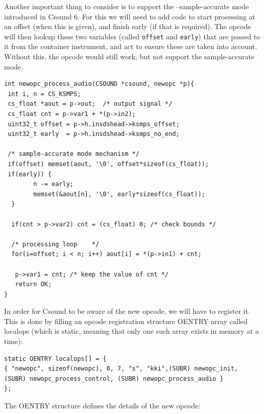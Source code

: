 \documentclass[11pt]{article}
\begin{document}
Another important thing to consider is to support the --sample-accurate mode introduced in Csound 6. For this we will need to add code to start processing at an offset (when this is given), and finish early (if that is required). The opcode will then lookup these two variables (called {\tt offset} and {\tt early}) that are passed to it from the container instrument, and act to ensure these are taken into account. Without this, the opcode would still work, but not support the sample-accurate mode.

\begin{lstlisting}
int newopc_process_audio(CSOUND *csound, newopc *p){
 int i, n = CS_KSMPS;
 cs_float *aout = p->out;  /* output signal */
 cs_float cnt = p->var1 + *(p->in2);
 uint32_t offset = p->h.insdshead->ksmps_offset;
 uint32_t early  = p->h.insdshead->ksmps_no_end;

 /* sample-accurate mode mechanism */
 if(offset) memset(aout, '\0', offset*sizeof(cs_float));
 if(early)) {
        n -= early;
        memset(&aout[n], '\0', early*sizeof(cs_float));
  }         

  if(cnt > p->var2) cnt = (cs_float) 0; /* check bounds */
	
  /* processing loop    */
  for(i=offset; i < n; i++) aout[i] = *(p->in1) + cnt;
	
   p->var1 = cnt; /* keep the value of cnt */
   return OK;
}
\end{lstlisting}


In order for Csound to be aware of the new opcode, we will have to register it. This is done by filling an opcode registration structure OENTRY array called localops (which is static, meaning that only one such array exists in memory at a time):

\begin{lstlisting}
static OENTRY localops[] = {
{ "newopc", sizeof(newopc), 0, 7, "s", "kki",(SUBR) newopc_init, 
(SUBR) newopc_process_control, (SUBR) newopc_process_audio }
};
\end{lstlisting}

The OENTRY structure defines the details of the new opcode:
\end{document}
